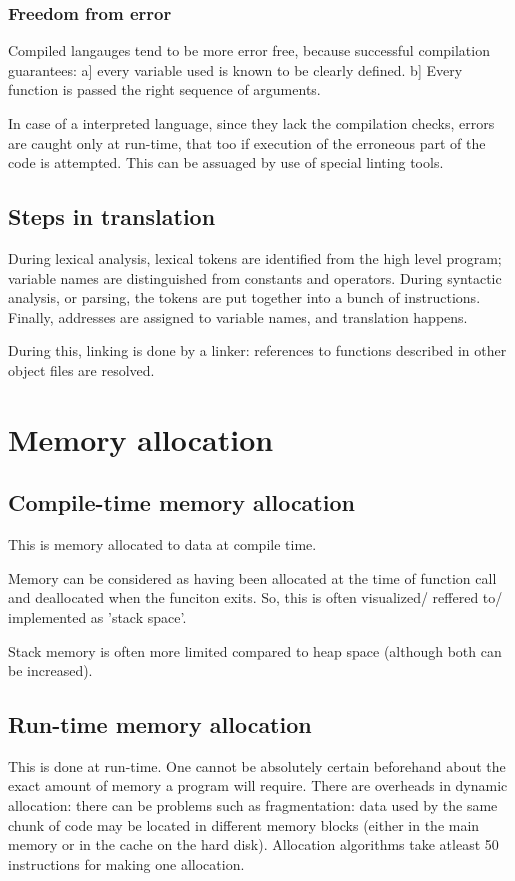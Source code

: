 \subsubsection{Freedom from error}
Compiled langauges tend to be more error free, because successful compilation guarantees: a] every variable used is known  to be clearly defined. b] Every function is passed the right sequence of arguments.

In case of a interpreted language, since they lack the compilation checks, errors are caught only at run-time, that too if execution of the erroneous part of the code is attempted. This can be assuaged by use of special linting tools.

\subsection{Steps in translation}
During lexical analysis, lexical tokens are identified from the high level program; variable names are distinguished from constants and operators. During syntactic analysis, or parsing, the tokens are put together into a bunch of instructions. Finally, addresses are assigned to variable names, and translation happens.

During this, linking is done by a linker: references to functions described in other object files are resolved.

\section{Memory allocation}
\subsection{Compile-time memory allocation}
This is memory allocated to data at compile time.

Memory can be considered as having been allocated at the time of function call and deallocated when the funciton exits. So, this is often visualized/ reffered to/ implemented as 'stack space'.

Stack memory is often more limited compared to heap space (although both can be increased).

\subsection{Run-time memory allocation}
This is done at run-time. One cannot be absolutely certain beforehand about the exact amount of memory a program will require. There are overheads in dynamic allocation: there can be problems such as fragmentation: data used by the same chunk of code may be located in different memory blocks (either in the main memory or in the cache on the hard disk). Allocation algorithms take atleast 50 instructions for making one allocation.

